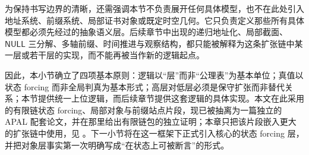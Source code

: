 为保持书写边界的清晰，还需强调本节不负责展开任何具体模型，也不在此处引入地址系统、前缀系统、局部证书对象或既定时空几何。它只负责定义那些所有具体模型都必须先经过的抽象语义层。后续章节中出现的递归地址化、局部截面、\(\mathsf{NULL}\) 三分解、多轴前缀、时间推进与观察结构，都只能被解释为这条扩张链中某一层或若干层的实现，而不能再被当作新的逻辑起点。

因此，本小节确立了四项基本原则：逻辑以“层”而非“公理表”为基本单位；真值以状态 forcing 而非全局判真为基本形式；高层对低层必须是保守扩张而非替代关系；本节提供统一上位逻辑，而后续章节提供这套逻辑的具体实现。本文在此采用的有限链状态 forcing、局部对象与前缀站点片段，现已被抽离为一篇独立的 APAL 配套论文，并在那里给出有限链包的独立证明；本章只把该片段嵌入更大的扩张链中使用，见 \cite{MaZhang2026StateForcingSemantics}。下一小节将在这一框架下正式引入核心的状态 forcing 层，并把对象层事实第一次明确写成“在状态上可被断言”的形式。
